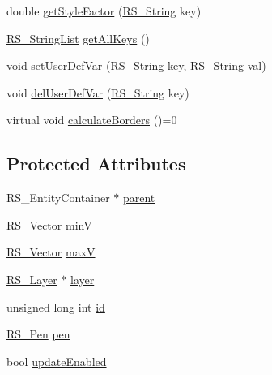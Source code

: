 \begin{DoxyCompactItemize}
\item 
double \hyperlink{class_r_s___entity_adf91e039da3593770ee37c2f8ea24874}{get\-Style\-Factor} (\hyperlink{rs__string_8h_a5adec11f318c2ae2ecdc6fe2b03be9fa}{R\-S\-\_\-\-String} key)
\item 
\hyperlink{rs__stringlist_8h_a9a5b49b0585b1937a2fd117e8c2f0812}{R\-S\-\_\-\-String\-List} \hyperlink{class_r_s___entity_a5fc9fec26b26100e61b2dc18646fd3fb}{get\-All\-Keys} ()
\item 
void \hyperlink{class_r_s___entity_ac92ee5023ce563f4e7d537daef1605a5}{set\-User\-Def\-Var} (\hyperlink{rs__string_8h_a5adec11f318c2ae2ecdc6fe2b03be9fa}{R\-S\-\_\-\-String} key, \hyperlink{rs__string_8h_a5adec11f318c2ae2ecdc6fe2b03be9fa}{R\-S\-\_\-\-String} val)
\item 
void \hyperlink{class_r_s___entity_a6dee3cacf6c66bedda7df196acacb67b}{del\-User\-Def\-Var} (\hyperlink{rs__string_8h_a5adec11f318c2ae2ecdc6fe2b03be9fa}{R\-S\-\_\-\-String} key)
\item 
virtual void \hyperlink{class_r_s___entity_a9544c0202aaf06d508068b20459f3df5}{calculate\-Borders} ()=0
\end{DoxyCompactItemize}
\subsection*{Protected Attributes}
\begin{DoxyCompactItemize}
\item 
R\-S\-\_\-\-Entity\-Container $\ast$ \hyperlink{class_r_s___entity_a80358a8d2fc6739a516a278dc500b49f}{parent}
\item 
\hyperlink{class_r_s___vector}{R\-S\-\_\-\-Vector} \hyperlink{class_r_s___entity_a4c88d3b694aac7189c05df009b48ee72}{min\-V}
\item 
\hyperlink{class_r_s___vector}{R\-S\-\_\-\-Vector} \hyperlink{class_r_s___entity_a43e0b8304f11fa91e079f0dcaad9f73a}{max\-V}
\item 
\hyperlink{class_r_s___layer}{R\-S\-\_\-\-Layer} $\ast$ \hyperlink{class_r_s___entity_a6e738a0a081f97b9923787777e639b27}{layer}
\item 
unsigned long int \hyperlink{class_r_s___entity_a491c2b6d300c8dcb8fad96abf2eb547d}{id}
\item 
\hyperlink{class_r_s___pen}{R\-S\-\_\-\-Pen} \hyperlink{class_r_s___entity_a9651a97a17dda8a5d2706e50fcf8c6f7}{pen}
\item 
bool \hyperlink{class_r_s___entity_a3136a9226397901cd8d642a9678ceff0}{update\-Enabled}
\end{DoxyCompactItemize}
